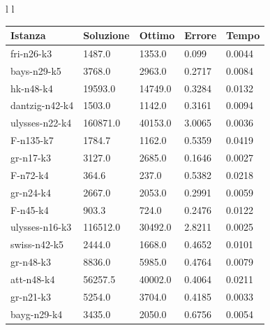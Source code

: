 \documentclass[]{article}
\begin{document}
\begin{tabular}{l l}
	\small	
		\begin{tabular}{||l | l l l l||} 
			\hline
			Istanza & Soluzione & Ottimo & Errore & Tempo \\ [0.5ex] 
			\hline\hline
			fri-n26-k3 & 1487.0 & 1353.0 & 0.099 & 0.0044  \\
			bays-n29-k5 & 3768.0 & 2963.0 & 0.2717 & 0.0084  \\
			hk-n48-k4 & 19593.0 & 14749.0 & 0.3284 & 0.0132  \\
			dantzig-n42-k4 & 1503.0 & 1142.0 & 0.3161 & 0.0094  \\
			ulysses-n22-k4 & 160871.0 & 40153.0 & 3.0065 & 0.0036  \\
			F-n135-k7 & 1784.7 & 1162.0 & 0.5359 & 0.0419  \\
			gr-n17-k3 & 3127.0 & 2685.0 & 0.1646 & 0.0027  \\
			F-n72-k4 & 364.6 & 237.0 & 0.5382 & 0.0218  \\
			gr-n24-k4 & 2667.0 & 2053.0 & 0.2991 & 0.0059  \\
			F-n45-k4 & 903.3 & 724.0 & 0.2476 & 0.0122  \\
			ulysses-n16-k3 & 116512.0 & 30492.0 & 2.8211 & 0.0025  \\
			swiss-n42-k5 & 2444.0 & 1668.0 & 0.4652 & 0.0101  \\
			gr-n48-k3 & 8836.0 & 5985.0 & 0.4764 & 0.0079  \\
			att-n48-k4 & 56257.5 & 40002.0 & 0.4064 & 0.0211  \\
			gr-n21-k3 & 5254.0 & 3704.0 & 0.4185 & 0.0033  \\
			bayg-n29-k4 & 3435.0 & 2050.0 & 0.6756 & 0.0054  \\			
			[1ex] 
			\hline
		\end{tabular}


\end{tabular}
\end{document}
